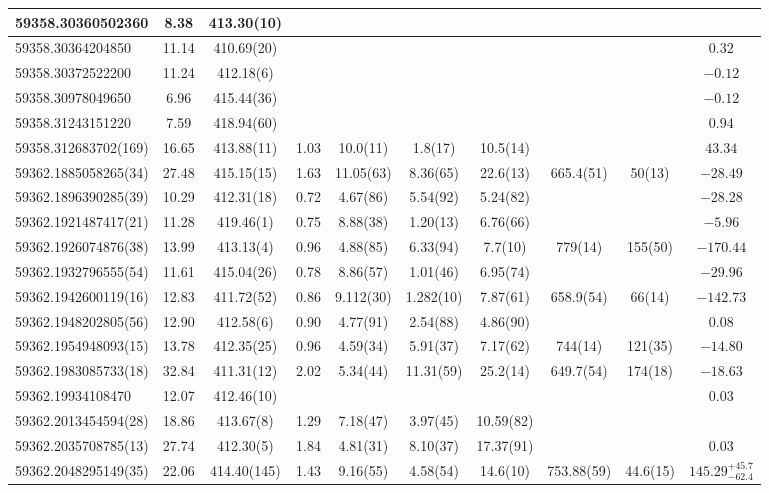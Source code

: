 \documentclass[preprint2, trackchanges]{aastex631}
\begin{document}
{{\begin{longtable}{lccccccccc}
\hline
59358.30360502360 & 8.38 & 413.30(10) &  &  &  &   &  &  &  \\
\hline
59358.30364204850 & 11.14 & 410.69(20) &  &  &   &  &  &  & $0.32$ \\
\hline
59358.30372522200 & 11.24 & 412.18(6) &  &  &  &   &  &  & $-0.12$ \\
\hline
59358.30978049650 & 6.96 & 415.44(36) &  &  &   &  &  &  & $-0.12$ \\
\hline
59358.31243151220 & 7.59 & 418.94(60) &  &  &   &  &  &  & $0.94$ \\
\hline
59358.312683702(169) & 16.65 & 413.88(11) & 1.03 & 10.0(11) & 1.8(17)  & 10.5(14) &  &  & $43.34$ \\
\hline
59362.1885058265(34) & 27.48 & 415.15(15) & 1.63 & 11.05(63) & 8.36(65)  & 22.6(13) & 665.4(51) & 50(13) & $-28.49$ \\
\hline
59362.1896390285(39) & 10.29 & 412.31(18) & 0.72 & 4.67(86) & 5.54(92)  & 5.24(82) &  &  & $-28.28$ \\
\hline
59362.1921487417(21) & 11.28 & 419.46(1) & 0.75 & 8.88(38) & 1.20(13)  & 6.76(66) &  &  & $-5.96$ \\
\hline
59362.1926074876(38) & 13.99 & 413.13(4) & 0.96 & 4.88(85) & 6.33(94)  & 7.7(10) & 779(14) & 155(50) & $-170.44$ \\
\hline
59362.1932796555(54) & 11.61 & 415.04(26) & 0.78 & 8.86(57) & 1.01(46)  & 6.95(74) &  &  & $-29.96$ \\
\hline
59362.1942600119(16) & 12.83 & 411.72(52) & 0.86 & 9.112(30) & 1.282(10)  & 7.87(61) & 658.9(54) & 66(14) & $-142.73$ \\
\hline
59362.1948202805(56) & 12.90 & 412.58(6) & 0.90 & 4.77(91) & 2.54(88)  & 4.86(90) &  &  & $0.08$ \\
\hline
59362.1954948093(15) & 13.78 & 412.35(25) & 0.96 & 4.59(34) & 5.91(37)  & 7.17(62) & 744(14) & 121(35) & $-14.80$ \\
\hline
59362.1983085733(18) & 32.84 & 411.31(12) & 2.02 & 5.34(44) & 11.31(59)  & 25.2(14) & 649.7(54) & 174(18) & $-18.63$ \\
\hline
59362.19934108470 & 12.07 & 412.46(10) &  &   &  &  &  &  & $0.03$ \\
\hline
59362.2013454594(28) & 18.86 & 413.67(8) & 1.29 & 7.18(47) & 3.97(45)  & 10.59(82) &  &  &  \\
\hline
59362.2035708785(13) & 27.74 & 412.30(5) & 1.84 & 4.81(31) & 8.10(37)  & 17.37(91) &  &  & $0.03$ \\
\hline
59362.2048295149(35) & 22.06 & 414.40(145) & 1.43 & 9.16(55) & 4.58(54)  & 14.6(10) & 753.88(59) & 44.6(15) & $145.29^{+45.7}_{-62.4}$ \\

\end{longtable}}}
\end{document}

